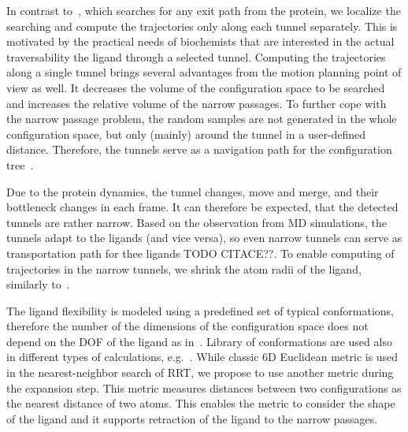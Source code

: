 \documentclass[usletter, 10pt, conference]{ieeeconf} %
\begin{document}
In contrast to~\cite{cortes2010simulating}, which searches for any exit path from the protein, we localize the searching and compute the trajectories only along each tunnel separately.
This is motivated by the practical needs of biochemists that are interested in the actual traversability the ligand through a selected tunnel.
Computing the trajectories along a single tunnel brings several advantages from the motion planning point of view as well.
It decreases the volume of the configuration space to be searched and increases the relative volume of the narrow passages.
To further cope with the narrow passage problem, the random samples are not generated in the whole configuration space, but only (mainly) around
the tunnel in a user-defined distance.
Therefore, the tunnels serve as a navigation path for the configuration tree~\cite{vonasek2009rrt}.

Due to the protein dynamics, the tunnel changes, move and merge, and their bottleneck changes in each frame.
It can therefore be expected, that the detected tunnels are rather narrow.
Based on the observation from MD simulations, the tunnels adapt to the ligands (and vice versa), so even narrow tunnels can serve as transportation path for thee ligands TODO CITACE??.
To enable computing of trajectories in the narrow tunnels, we shrink the atom radii of the ligand, similarly to~\cite{cortes2010simulating,guieysse2008structure}.

The ligand flexibility is modeled using a predefined set of typical conformations, therefore the number of the dimensions of the configuration space does not depend on the DOF of the ligand as in~\cite{cortes2010simulating}.
Library of conformations are used also in different types of calculations, e.g.~\cite{kellogg}. 
While classic 6D Euclidean metric is used in the nearest-neighbor search of RRT, we propose to use another metric during the expansion step.
This metric measures distances between two configurations as the nearest distance of two atoms. 
This enables the metric to consider the shape of the ligand and it supports retraction of the ligand to the narrow passages.


\end{document}
